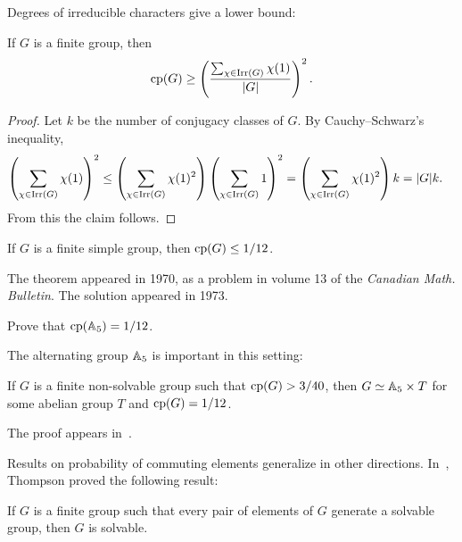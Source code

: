 Degrees of irreducible characters give a lower bound:

\begin{proposition}
If $G$ is a finite group, then
\[
\operatorname{cp}(G)\geq\left(\frac{\sum_{\chi\in\operatorname{Irr}(G)}\chi(1)}{|G|}\right)^2.
\]
\end{proposition}

\begin{proof}
    Let $k$ be the number of conjugacy classes of $G$.
    By Cauchy--Schwarz's inequality, 
    \begin{align*}
        \left(\sum_{\chi\in\operatorname{Irr}(G)}\chi(1)\right)^2
        &\leq\left(\sum_{\chi\in\operatorname{Irr}(G)}\chi(1)^2\right)\left(\sum_{\chi\in\operatorname{Irr}(G)}1\right)^2
        =\left(\sum_{\chi\in\operatorname{Irr}(G)}\chi(1)^2\right)k=|G|k.
    \end{align*}
    From this the claim follows.
\end{proof}

\begin{theorem}[Dixon]
    If $G$ is a finite simple group, then $\operatorname{cp}(G)\leq1/12$.
\end{theorem}

The theorem appeared in 1970, as a problem in 
volume 13 of the \emph{Canadian Math. Bulletin}. The solution
appeared in 1973. 

\begin{exercise}
    Prove that $\operatorname{cp}(\mathbb{A}_5)=1/12$. 
\end{exercise}

The alternating group $\mathbb{A}_5$ is important in this setting:

\begin{theorem}
    If $G$ is a finite non-solvable group such that $\operatorname{cp}(G)>3/40$, then
    $G\simeq\mathbb{A}_5\times T$ for some abelian group 
    $T$ and $\operatorname{cp}(G)=1/12$. 
\end{theorem}

The proof appears in~\cite{MR2228209}.

Results on probability of commuting elements generalize in other directions. 
In~\cite{MR230809,MR276325,MR313378,MR369512}, 
Thompson proved the following result:

\begin{theorem}[Thompson]
    If $G$ is a finite group such that 
    every pair of elements of $G$ generate
    a solvable group, then $G$ is solvable. 
\end{theorem}

